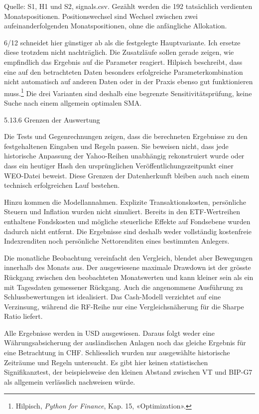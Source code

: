 \documentclass[
  ngerman,
  a4paper,
  DIV=11,
  oneside]{scrreprt}
\begin{document}
Quelle: S1, H1 und S2, signals.csv. Gezählt werden die 192 tatsächlich
verdienten Monatspositionen. Positionswechsel sind Wechsel zwischen zwei
aufeinanderfolgenden Monatspositionen, ohne die anfängliche Allokation.

6/12 schneidet hier günstiger ab als die festgelegte Hauptvariante. Ich
ersetze diese trotzdem nicht nachträglich. Die Zusatzläufe sollen gerade
zeigen, wie empfindlich das Ergebnis auf die Parameter reagiert.
Hilpisch beschreibt, dass eine auf den betrachteten Daten besonders
erfolgreiche Parameterkombination nicht automatisch auf anderen Daten
oder in der Praxis ebenso gut funktionieren muss.\footnote{Hilpisch,
  \emph{Python for Finance}, Kap. 15, «Optimization».} Die drei
Varianten sind deshalb eine begrenzte Sensitivitätsprüfung, keine Suche
nach einem allgemein optimalen SMA.

5.13.6 Grenzen der Auswertung

Die Tests und Gegenrechnungen zeigen, dass die berechneten Ergebnisse zu
den festgehaltenen Eingaben und Regeln passen. Sie beweisen nicht, dass
jede historische Anpassung der Yahoo-Reihen unabhängig rekonstruiert
wurde oder dass ein heutiger Hash den ursprünglichen
Veröffentlichungszeitpunkt einer WEO-Datei beweist. Diese Grenzen der
Datenherkunft bleiben auch nach einem technisch erfolgreichen Lauf
bestehen.

Hinzu kommen die Modellannahmen. Explizite Transaktionskosten,
persönliche Steuern und Inflation wurden nicht simuliert. Bereits in den
ETF-Wertreihen enthaltene Fondskosten und mögliche steuerliche Effekte
auf Fondsebene wurden dadurch nicht entfernt. Die Ergebnisse sind
deshalb weder vollständig kostenfreie Indexrenditen noch persönliche
Nettorenditen eines bestimmten Anlegers.

Die monatliche Beobachtung vereinfacht den Vergleich, blendet aber
Bewegungen innerhalb des Monats aus. Der ausgewiesene maximale Drawdown
ist der grösste Rückgang zwischen den beobachteten Monatswerten und kann
kleiner sein als ein mit Tagesdaten gemessener Rückgang. Auch die
angenommene Ausführung zu Schlussbewertungen ist idealisiert. Das
Cash-Modell verzichtet auf eine Verzinsung, während die RF-Reihe nur
eine Vergleichsnäherung für die Sharpe Ratio liefert.

Alle Ergebnisse werden in USD ausgewiesen. Daraus folgt weder eine
Währungsabsicherung der ausländischen Anlagen noch das gleiche Ergebnis
für eine Betrachtung in CHF. Schliesslich wurden nur ausgewählte
historische Zeiträume und Regeln untersucht. Es gibt hier keinen
statistischen Signifikanztest, der beispielsweise den kleinen Abstand
zwischen VT und BIP-G7 als allgemein verlässlich nachweisen würde.
\end{document}
